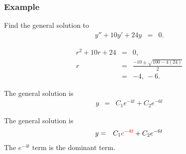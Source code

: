 \begin{frame}
  \frametitle{Example}

  Find the general solution to
  \begin{eqnarray*}
    y'' + 10 y' + 24y & = & 0.
  \end{eqnarray*}

  {
    \begin{eqnarray*}
      r^2 + 10r + 24 & = & 0, \\
      r & = & \frac{-10\pm\sqrt{100-4(24)}}{2} \\
      & = & -4,~ -6.
    \end{eqnarray*}
  }

  {
    The general solution is
    \begin{eqnarray*}
      y & = & C_1 e^{-4t} + C_2 e^{-6t}
    \end{eqnarray*}
  }

  {
    The general solution is
    \begin{eqnarray*}
      y & = & C_1 {\color{red}e^{-4t}} + C_2 e^{-6t}
    \end{eqnarray*}
    The $e^{-4t}$ term is the dominant term.
  }


\end{frame}

%
%
%
%
%


%
%
%
%

